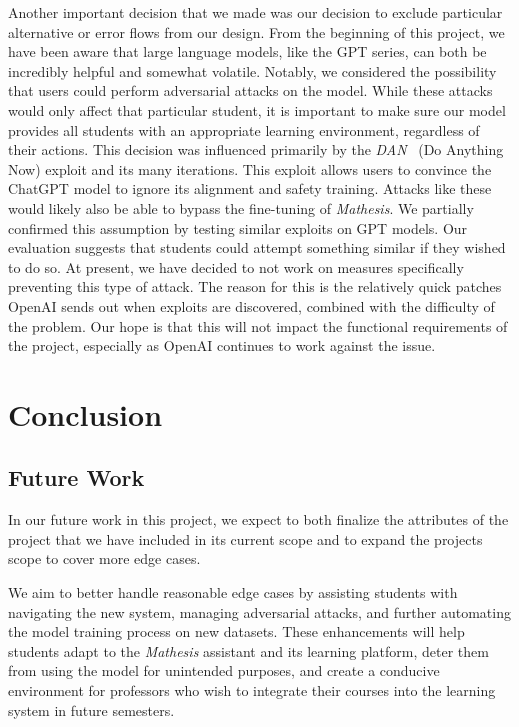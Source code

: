 \documentclass[12pt,a4paper]{article}
\begin{document}
    Another important decision that we made was our decision to exclude particular alternative or
    error flows from our design.  From the beginning of this project, we have been aware that
    large language models, like the GPT series, can both be incredibly helpful and somewhat volatile.
    Notably, we considered the possibility that users could perform adversarial attacks on the model.
    While these attacks would only affect that particular student, it is important to make sure
    our model provides all students with an appropriate learning environment, regardless of their actions.
    This decision was influenced primarily by the \textit{DAN}~\cite{danThread} (Do Anything Now)
    exploit and its many iterations.  This exploit allows users to convince the ChatGPT model to
    ignore its alignment and safety training.  Attacks like these would likely also be able to
    bypass the fine-tuning of \textit{Mathesis}.  We partially confirmed this assumption by testing
    similar exploits on GPT models.  Our evaluation suggests that students could attempt something
    similar if they wished to do so.  At present, we have decided to not work on measures
    specifically preventing this type of attack.  The reason for this is the relatively quick
    patches OpenAI sends out when exploits are discovered, combined with the difficulty of the
    problem.  Our hope is that this will not impact the functional requirements of the project,
    especially as OpenAI continues to work against the issue.

    \section{Conclusion}

    \subsection{Future Work}
    In our future work in this project, we expect to both finalize the attributes of the project that
    we have included in its current scope and to expand the projects scope to cover more edge cases.

    We aim to better handle reasonable edge cases by assisting students with navigating the new system,
    managing adversarial attacks, and further automating the model training process on new datasets.
    These enhancements will help students adapt to the \textit{Mathesis} assistant and its learning platform,
    deter them from using the model for unintended purposes, and create a conducive environment for
    professors who wish to integrate their courses into the learning system in future semesters.
\end{document}
